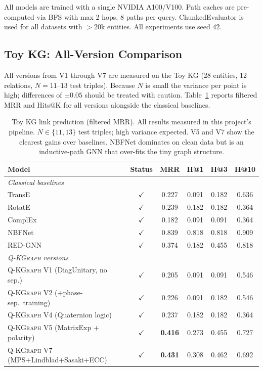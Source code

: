 \documentclass[runningheads]{llncs}
\newcommand{\QR}{\textsc{Q-KGraph}}
\begin{document}
All models are trained with a single NVIDIA A100/V100.  Path caches are
pre-computed via BFS with max 2 hops, 8 paths per query.  ChunkedEvaluator
is used for all datasets with $>$20k entities.  All experiments use seed 42.

\subsection{Toy KG: All-Version Comparison}
\label{sec:toy}

All versions from V1 through V7 are measured on the Toy KG
(28 entities, 12 relations, $N=11$--$13$ test triples).  Because $N$ is small
the variance per point is high; differences of $\pm0.05$ should be treated
with caution.  Table~\ref{tab:toy_all} reports filtered MRR and Hits@K for
all versions alongside the classical baselines.

\begin{table}[t]
\caption{Toy KG link prediction (filtered MRR).  All results measured in this
  project's pipeline.  $N\in\{11,13\}$ test triples; high variance expected.
  V5 and V7 show the clearest gains over baselines.  NBFNet dominates on clean
  data but is an inductive-path GNN that over-fits the tiny graph structure.}
\label{tab:toy_all}
\centering
\small
\begin{tabular}{lccccc}
\toprule
Model                              & Status & MRR   & H@1   & H@3   & H@10  \\
\midrule
\multicolumn{6}{l}{\textit{Classical baselines}} \\
TransE                             & $\checkmark$ & 0.227 & 0.091 & 0.182 & 0.636 \\
RotatE                             & $\checkmark$ & 0.239 & 0.182 & 0.182 & 0.364 \\
ComplEx                            & $\checkmark$ & 0.182 & 0.091 & 0.091 & 0.364 \\
NBFNet~\cite{ref_nbfnet}           & $\checkmark$ & 0.839 & 0.818 & 0.818 & 0.909 \\
RED-GNN~\cite{ref_redgnn}          & $\checkmark$ & 0.374 & 0.182 & 0.455 & 0.818 \\
\midrule
\multicolumn{6}{l}{\textit{\QR{} versions}} \\
\QR{} V1 (DiagUnitary, no sep.)    & $\checkmark$ & 0.205 & 0.091 & 0.091 & 0.546 \\
\QR{} V2 (+phase-sep.\ training)   & $\checkmark$ & 0.226 & 0.091 & 0.182 & 0.546 \\
\QR{} V4 (Quaternion logic)        & $\checkmark$ & 0.237 & 0.182 & 0.182 & 0.364 \\
\QR{} V5 (MatrixExp + polarity)    & $\checkmark$ & \textbf{0.416} & 0.273 & 0.455 & 0.727 \\
\QR{} V7 (MPS+Lindblad+Sasaki+ECC)& $\checkmark$ & \textbf{0.431} & 0.308 & 0.462 & 0.692 \\
\bottomrule
\end{tabular}
\end{table}
\end{document}
